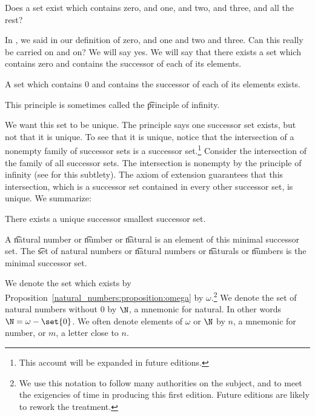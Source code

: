 

Does a set exist which contains zero, and one, and two, and three, and all the rest?


In ,
we said  in our definition of zero, and one and two and three.
Can this really be carried on and on?
We will say yes.
We will say that there exists a set which contains zero and contains the successor of each of its elements.

\begin{principle}
  A set which contains 0 and contains the successor of each of its elements exists.
\end{principle}
This principle is sometimes called the \t{principle of infinity}.

We want this set to be unique.
The principle says one successor set exists, but not that it is unique.
To see that it is unique, notice that the intersection of a nonempty family of successor sets is a successor set.\footnote{This account will be expanded in future editions.}
Consider the intersection of the family of all successor sets.
The intersection is nonempty by the principle of infinity (see  for this subtlety).
The axiom of extension guarantees that this intersection, which is a successor set contained in every other successor set, is unique.
We summarize:

\begin{proposition}
  There exists a unique successor smallest successor set.
  \label{natural_numbers:proposition:omega}
\end{proposition}

A \t{natural number} or \t{number} or \t{natural} is an element of this minimal successor set.
The \t{set of natural numbers} or \t{natural numbers} or \t{naturals} or \t{numbers} is the minimal successor set.


We denote the set which exists by Proposition~\ref{natural_numbers:proposition:omega} by $\omega$.\footnote{We use this notation to follow many authorities on the subject, and to meet the exigencies of time in producing this first edition. Future editions are likely to rework the treatment.}
We denote the set of natural numbers without 0 by $\N$, a mnemonic for natural.
In other words $\N = \omega - \set{0}$.
We often denote elements of $\omega$ or $\N$ by $n$, a mnemonic for number, or $m$, a letter close to $n$.

